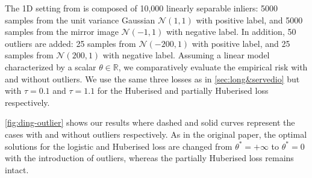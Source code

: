 The 1D setting from \citet{ding_statistical_2013} is composed of 10,000 linearly separable inliers: 5000 samples from the unit variance Gaussian $\mathcal{N}(1,1)$ with positive label, and 5000 samples from the mirror image $\mathcal{N}(-1,1)$ with negative label.  In addition, 50 outliers are added: 25 samples from $\mathcal{N}(-200,1)$ with positive label, and 25 samples from $\mathcal{N}(200,1)$ with negative label.
Assuming a linear model characterized by a scalar $\theta \in \mathbb{R}$, we comparatively evaluate the empirical risk with and without outliers. We use the same three losses as in \autoref{sec:long&servedio} but with $\tau = 0.1$ and $\tau = 1.1$ for the Huberised and partially Huberised loss respectively. \footnotemark \


\autoref{fig:ding-outlier} shows our results where dashed and solid curves represent the cases with and without outliers respectively. As in the original paper, the optimal solutions for the logistic and Huberised loss are changed from $\theta^* = +\infty$ to $\theta^* = 0$ with the introduction of outliers, whereas the partially Huberised loss remains intact.

